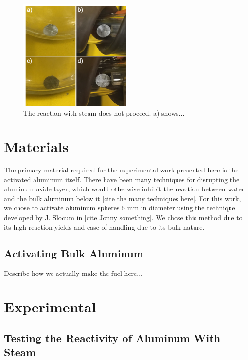 \documentclass[preprint,12pt,3p]{elsarticle}
\begin{document}
\begin{figure}
  \centering
  \includegraphics[width=0.5\textwidth]{fig/steam_test_min}
  \caption{The reaction with steam does not proceed. a) shows...}
  \label{fig:steam_test}
\end{figure}

\section{Materials}
\label{materials}

The primary material required for the experimental work presented here is the
activated aluminum itself. There have been many techniques for disrupting the
aluminum oxide layer, which would otherwise inhibit the reaction between water
and the bulk aluminum below it [cite the many techniques here]. For this work,
we chose to activate aluminum spheres 5 mm in diameter using the technique
developed by J. Slocum in [cite Jonny something]. We chose this method due to
its high reaction yields and ease of handling due to its bulk nature.

\subsection{Activating Bulk Aluminum}

Describe how we actually make the fuel here...

\section{Experimental}
\label{experimental}

\subsection{Testing the Reactivity of Aluminum With Steam}
\end{document}
